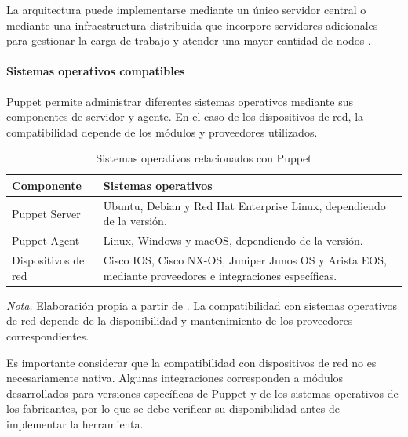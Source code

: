 \documentclass[12pt,a4paper]{article}
\begin{document}
La arquitectura puede implementarse mediante un único servidor
central o mediante una infraestructura distribuida que incorpore
servidores adicionales para gestionar la carga de trabajo y
atender una mayor cantidad de nodos
\parencite{puppet_documentation}.


\paragraph{Sistemas operativos compatibles}

Puppet permite administrar diferentes sistemas operativos
mediante sus componentes de servidor y agente. En el caso
de los dispositivos de red, la compatibilidad depende de
los módulos y proveedores utilizados.

\begin{table}[H]
    \centering
    \caption{Sistemas operativos relacionados con Puppet}
    \label{tab:so_puppet}

    \begin{tabularx}{\textwidth}{p{}X}
        \toprule

        \textbf{Componente} &
        \textbf{Sistemas operativos} \\

        \midrule

        Puppet Server &
        Ubuntu, Debian y Red Hat Enterprise Linux,
        dependiendo de la versión. \\

        Puppet Agent &
        Linux, Windows y macOS, dependiendo de la versión. \\

        Dispositivos de red &
        Cisco IOS, Cisco NX-OS, Juniper Junos OS y Arista EOS,
        mediante proveedores e integraciones específicas. \\

        \bottomrule
    \end{tabularx}

    \vspace{0.2cm}

    {\footnotesize
    \textit{Nota.} Elaboración propia a partir de
    \parencite{puppet_documentation,puppet_device}.
    La compatibilidad con sistemas operativos de red depende
    de la disponibilidad y mantenimiento de los proveedores
    correspondientes.}
\end{table}

Es importante considerar que la compatibilidad con dispositivos
de red no es necesariamente nativa. Algunas integraciones
corresponden a módulos desarrollados para versiones específicas
de Puppet y de los sistemas operativos de los fabricantes,
por lo que se debe verificar su disponibilidad antes de
implementar la herramienta.
\end{document}
